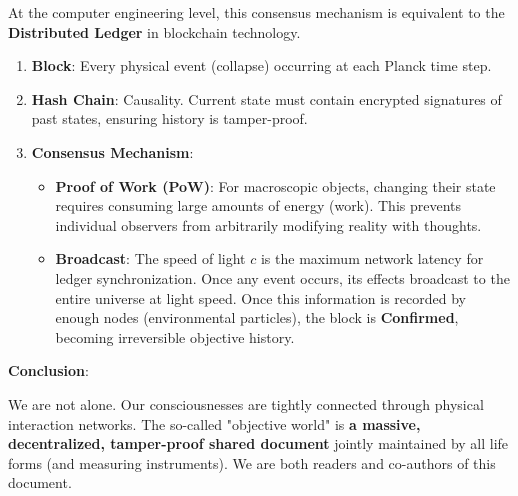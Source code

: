 At the computer engineering level, this consensus mechanism is equivalent to the \textbf{Distributed Ledger} in blockchain technology.

\begin{enumerate}
\item \textbf{Block}: Every physical event (collapse) occurring at each Planck time step.

\item \textbf{Hash Chain}: Causality. Current state must contain encrypted signatures of past states, ensuring history is tamper-proof.

\item \textbf{Consensus Mechanism}:

    \begin{itemize}
    \item \textbf{Proof of Work (PoW)}: For macroscopic objects, changing their state requires consuming large amounts of energy (work). This prevents individual observers from arbitrarily modifying reality with thoughts.

    \item \textbf{Broadcast}: The speed of light $c$ is the maximum network latency for ledger synchronization. Once any event occurs, its effects broadcast to the entire universe at light speed. Once this information is recorded by enough nodes (environmental particles), the block is \textbf{Confirmed}, becoming irreversible objective history.
    \end{itemize}
\end{enumerate}

\textbf{Conclusion}:

We are not alone. Our consciousnesses are tightly connected through physical interaction networks. The so-called "objective world" is \textbf{a massive, decentralized, tamper-proof shared document} jointly maintained by all life forms (and measuring instruments). We are both readers and co-authors of this document.
